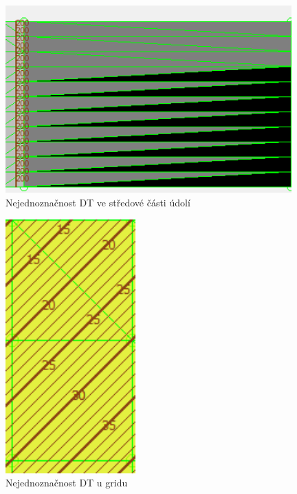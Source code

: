 \documentclass[a4paper,11pt,twoside]{article}
\begin{document}
\vspace{0.2cm}
\begin{figure}[hbt!] 
\begin{center}
\includegraphics[width=11cm]{pictures/valley_panchromatic_aspect_detail.PNG} 
\caption[Nejednoznačnost DT ve středové části údolí]{Nejednoznačnost DT ve středové části údolí}
\label{fig:valley_panchromatic_aspect_detail}
\end{center}
\end{figure}

\vspace{0.2cm}
\begin{figure}[hbt!] 
\begin{center}
\includegraphics[width=5cm]{pictures/grid_colorful_slope_detail.PNG} 
\caption[Nejednoznačnost DT u gridu]{Nejednoznačnost DT u gridu}
\label{fig:grid_colorful_slope_detail}
\end{center}
\end{figure}
\end{document}

